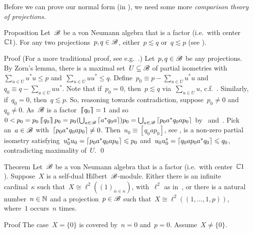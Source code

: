 \begin{parsec}%
\begin{point}%
Before we can prove our normal form (in ),
    we need some more \emph{comparison theory of projections}.
\end{point}
\begin{point}{Proposition}%
Let~$\mathscr{B}$ be a von Neumann algebra that is a factor (i.e.~with center~$\mathbb{C} 1$).
For any two projections~$p,q \in \mathscr{B}$,
    either~$p \lesssim q$ or~$q \lesssim p$ (see ).
\begin{point}{Proof}%
(For a more traditional proof, see e.g.~\cite[Prop.~6.2.4]{kr}.)
Let~$p,q \in \mathscr{B}$ be any projections.
By Zorn's lemma, there is a maximal
    set~$U\subseteq \mathscr{B}$ of partial isometries
    with~$\sum_{u\in U} u^*u \leq p$
    and~$\sum_{u\in U} uu^* \leq q$.
Define~$p_0 \equiv p - \sum_{u\in U} u^*u$
    and~$q_0 \equiv q - \sum_{u \in U} uu^*$.
Note that if~$p_0 = 0$, then~$p \lesssim q$
    via~$\sum_{u \in U} u$, c.f.~.
Similarly, if~$q_0 = 0$, then~$q \lesssim p$.
So, reasoning towards contradiction,
    suppose~$p_0 \neq 0$ and~$q_0 \neq 0$.
As~$\mathscr{B}$ is a factor~$\left\lceil\!\!\left\lceil q_0\right\rceil\!\!\right\rceil = 1$
    and so~$0 < p_0 = p_0\left\lceil\!\!\left\lceil q_0\right\rceil\!\!\right\rceil p_0 = p_0 (\bigcup_{a \in \mathscr{B}} \left\lceil a^* q_0 a \right\rceil) p_0
                = \bigcup_{a \in \mathscr{B}} \left\lceil p_0a^*q_0ap_0\right\rceil$
            by~ and~.
Pick an~$a \in \mathscr{B}$ with~$\left\lceil p_0a^*q_0ap_0\right\rceil \neq 0$.
Then~$u_0 \equiv [q_0ap_0]$, see ,
    is a non-zero partial isometry
    satisfying~$u_0^*u_0 = \left\lceil p_0a^*q_0ap_0\right\rceil \leqslant p_0$
    and~$u_0 u_0^* = \left\lceil q_0ap_0a^*q_0\right\rceil \leqslant q_0$,
    contradicting maximality of~$U$. \qed
\end{point}
\end{point}
\begin{point}{Theorem}%
Let~$\mathscr{B}$ be a von Neumann algebra that is a factor (i.e.~with center~$\mathbb{C} 1$).
Suppose~$X$ is a self-dual Hilbert~$\mathscr{B}$-module.
Either there is an infinite cardinal~$\kappa$
    such that~$X \cong \ell^2((1)_{\alpha \in \kappa})$,
    with~$\ell^2$ as in~,
    or there is a natural number~$n\in \mathbb{N}$
    and a projection~$p \in \mathscr{B}$
    such that~$X \cong \ell^2((1, \ldots, 1, p))$,
    where~$1$ occurs~$n$ times.
\begin{point}{Proof}%
The case~$X = \{0\}$ is covered by~$n=0$ and~$p=0$.
Assume~$X \neq \{0\}$.
\begin{point}%

\end{point}
\end{point}
\end{point}
\end{parsec}
